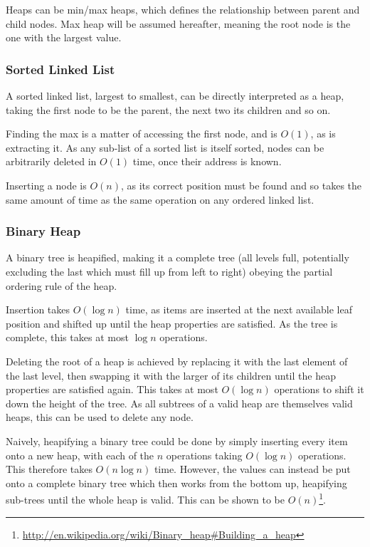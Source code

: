 \documentclass[]{article}
\begin{document}
Heaps can be min/max heaps, which defines the relationship between parent and child nodes. Max heap will be assumed hereafter, meaning the root node is the one with the largest value.

\subsubsection{Sorted Linked List}

A sorted linked list, largest to smallest, can be directly interpreted as a heap, taking the first node to be the parent, the next two its children and so on.

Finding the max is a matter of accessing the first node, and is $O(1)$, as is extracting it. As any sub-list of a sorted list is itself sorted, nodes can be arbitrarily deleted in $O(1)$ time, once their address is known.

Inserting a node is $O(n)$, as its correct position must be found and so takes the same amount of time as the same operation on any ordered linked list.

\subsubsection{Binary Heap}

A binary tree is heapified, making it a complete tree (all levels full, potentially excluding the last which must fill up from left to right) obeying the partial ordering rule of the heap.

Insertion takes $O(\log{n})$ time, as items are inserted at the next available leaf position and shifted up until the heap properties are satisfied. As the tree is complete, this takes at most $\log{n}$ operations.

Deleting the root of a heap is achieved by replacing it with the last element of the last level, then swapping it with the larger of its children until the heap properties are satisfied again. This takes at most $O(\log{n})$ operations to shift it down the height of the tree. As all subtrees of a valid heap are themselves valid heaps, this can be used to delete any node.

Naively, heapifying a binary tree could be done by simply inserting every item onto a new heap, with each of the $n$ operations taking $O(\log{n})$ operations. This therefore takes $O(n\log{n})$ time. However, the values can instead be put onto a complete binary tree which then works from the bottom up, heapifying sub-trees until the whole heap is valid. This can be shown to be $O(n)$\footnote{\url{http://en.wikipedia.org/wiki/Binary\_heap\#Building\_a\_heap}}.
\end{document}
